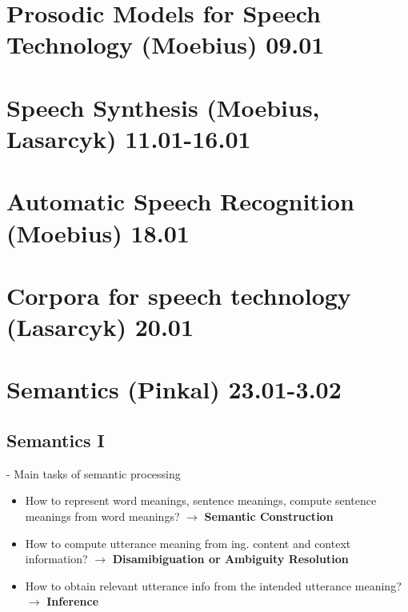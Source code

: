 \documentclass[11pt]{article}
\begin{document}
\section{Prosodic Models for Speech Technology (Moebius) 09.01}
%
\section{Speech Synthesis (Moebius, Lasarcyk) 11.01-16.01}
%
\section{Automatic Speech Recognition (Moebius) 18.01}
%
\section{Corpora for speech technology (Lasarcyk) 20.01}
%
\section{Semantics (Pinkal) 23.01-3.02}

\subsection{ Semantics I }
- Main tasks of semantic processing
\begin{itemize}
 \item How to represent word meanings, sentence meanings, compute sentence meanings from word meanings? $\rightarrow$ {\bf Semantic Construction}
 \item How to compute utterance meaning from ing. content and context information? $\rightarrow$ {\bf Disamibiguation or Ambiguity Resolution}
 \item How to obtain relevant utterance info from the intended utterance meaning? $\rightarrow$ {\bf Inference}
\end{itemize}
\end{document}

